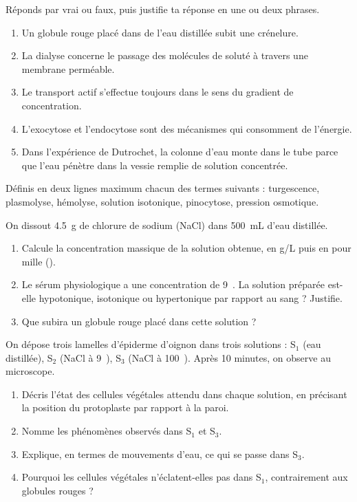 \documentclass[11pt]{article}
\newcommand{\cle}[1]{{\popxbold\color{popdark}#1}}
\newcounter{popsec}
\newcounter{popsub}
\newcommand{\courssub}[1]{%
  \stepcounter{popsub}%
  \par\vspace{9pt}\noindent{\popxbold\fontsize{11.5}{13}\selectfont\color{popink}{\color{poporange}\thepopsec.\thepopsub}\hspace{6pt}#1}\par\nopagebreak\vspace{4pt}
}
\begin{document}
\begin{exercice}
Réponds par vrai ou faux, puis justifie ta réponse en une ou deux phrases.
\begin{enumerate}
\item Un globule rouge placé dans de l'eau distillée subit une crénelure.
\item La dialyse concerne le passage des molécules de soluté à travers une membrane perméable.
\item Le transport actif s'effectue toujours dans le sens du gradient de concentration.
\item L'exocytose et l'endocytose sont des mécanismes qui consomment de l'énergie.
\item Dans l'expérience de Dutrochet, la colonne d'eau monte dans le tube parce que l'eau pénètre dans la vessie remplie de solution concentrée.
\end{enumerate}
\end{exercice}

\begin{exercice}
Définis en deux lignes maximum chacun des termes suivants : \cle{turgescence}, \cle{plasmolyse}, \cle{hémolyse}, \cle{solution isotonique}, \cle{pinocytose}, \cle{pression osmotique}.
\end{exercice}

\begin{exercice}
On dissout \num{4,5}~g de chlorure de sodium (NaCl) dans \num{500}~mL d'eau distillée.
\begin{enumerate}
\item Calcule la concentration massique de la solution obtenue, en g/L puis en pour mille (\textperthousand).
\item Le sérum physiologique a une concentration de 9~\textperthousand. La solution préparée est-elle hypotonique, isotonique ou hypertonique par rapport au sang ? Justifie.
\item Que subira un globule rouge placé dans cette solution ?
\end{enumerate}
\end{exercice}

\courssub{Je m'entraîne}

\begin{exercice}
On dépose trois lamelles d'épiderme d'oignon dans trois solutions : S$_1$ (eau distillée), S$_2$ (NaCl à 9~\textperthousand), S$_3$ (NaCl à 100~\textperthousand). Après 10 minutes, on observe au microscope.
\begin{enumerate}
\item Décris l'état des cellules végétales attendu dans chaque solution, en précisant la position du protoplaste par rapport à la paroi.
\item Nomme les phénomènes observés dans S$_1$ et S$_3$.
\item Explique, en termes de mouvements d'eau, ce qui se passe dans S$_3$.
\item Pourquoi les cellules végétales n'éclatent-elles pas dans S$_1$, contrairement aux globules rouges ?
\end{enumerate}
\end{exercice}
\end{document}
